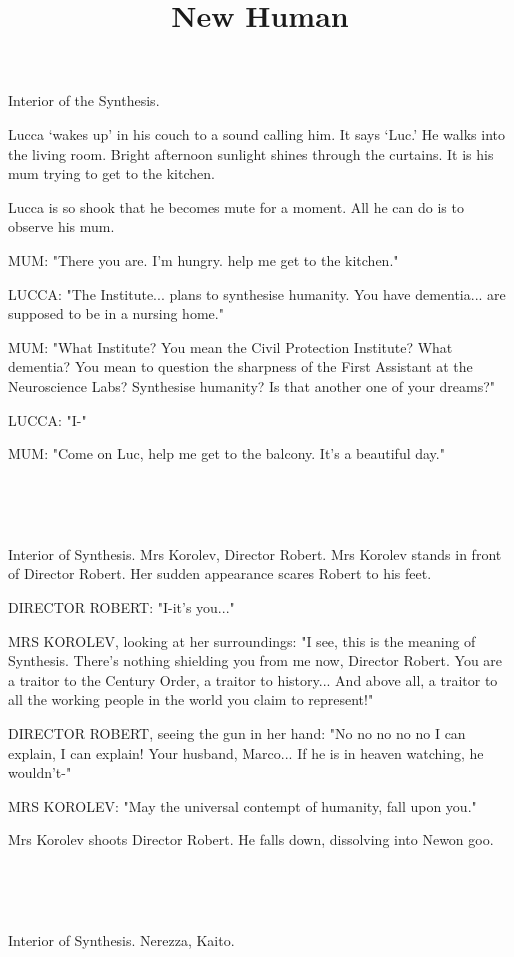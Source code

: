 \documentclass[11pt]{article}
\begin{document}
\ttfamily
\title{New Human}
\maketitle

Interior of the Synthesis.


Lucca `wakes up' in his couch to a sound calling him. 
It says `Luc.'
He walks into the living room. 
Bright afternoon sunlight shines through the curtains.
It is his mum trying to get to the kitchen.

Lucca is so shook that he becomes mute for a moment.
All he can do is to observe his mum.

MUM: "There you are.
I'm hungry.
help me get to the kitchen."

LUCCA: "The Institute... plans to synthesise humanity.
You have dementia... are supposed to be in a nursing home."

MUM: "What Institute? You mean the Civil Protection Institute? What dementia?
You mean to question the sharpness of the First Assistant at the Neuroscience Labs?
Synthesise humanity?
Is that another one of your dreams?"

LUCCA: "I-"

MUM: "Come on Luc, help me get to the balcony. It's a beautiful day."

\ 

\ 

Interior of Synthesis.
Mrs Korolev, Director Robert.
Mrs Korolev stands in front of Director Robert. 
Her sudden appearance scares Robert to his feet.

DIRECTOR ROBERT: "I-it's you..."

MRS KOROLEV, looking at her surroundings: "I see, this is the meaning of Synthesis.
There's nothing shielding you from me now, Director Robert.
You are a traitor to the Century Order, a traitor to history...
And above all, a traitor to all the working people in the world you claim to represent!"

DIRECTOR ROBERT, seeing the gun in her hand: "No no no no no I can explain, I can explain! 
Your husband, Marco...
If he is in heaven watching, he wouldn't-"

MRS KOROLEV: "May the universal contempt of humanity, fall upon you."

Mrs Korolev shoots Director Robert.
He falls down, dissolving into Newon goo.

\ 

\ 

Interior of Synthesis.
Nerezza, Kaito. 
\end{document}
